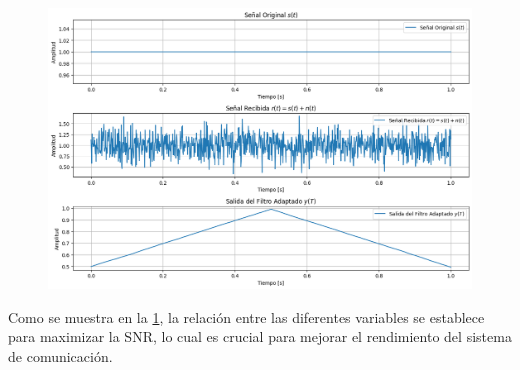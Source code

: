 \documentclass[
  11pt,
  letterpaper,
  answers
]{exam}
\begin{document}
\begin{questions}
\begin{solution}
\begin{figure}[H] %
  \centering
  \includegraphics[width=\textwidth]{hola_hola.png}
  \label{fig:SNR}
\end{figure}

Como se muestra en la \cref{fig:SNR}, la relación entre las diferentes variables se establece para maximizar la SNR, lo cual es crucial para mejorar el rendimiento del sistema de comunicación.


\end{solution}


\end{questions}
\end{document}
